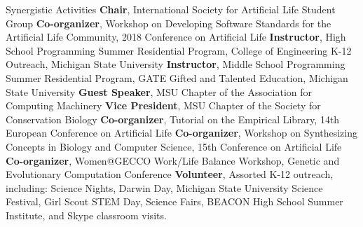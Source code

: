 \begin{rubric}{Synergistic Activities}
%
\entry*[2016 -- Present] \textbf{Chair}, International Society for Artificial Life Student Group 
%
\entry*[2018] \textbf{Co-organizer}, Workshop on Developing Software Standards for the Artificial Life Community, 2018 Conference on Artificial Life
%
\entry*[2017, 2018] \textbf{Instructor}, High School Programming Summer Residential Program, College of Engineering K-12 Outreach, Michigan State University
%
\entry*[2018] \textbf{Instructor}, Middle School Programming Summer Residential Program, GATE Gifted and Talented Education, Michigan State University
%
\entry*[2016 -- 2018] \textbf{Guest Speaker}, MSU Chapter of the Association for Computing Machinery
%
\entry*[2015 -- 2017] \textbf{Vice President}, MSU Chapter of the Society for Conservation Biology 
%
\entry*[2017] \textbf{Co-organizer}, Tutorial on the Empirical Library, 14th European Conference on Artificial Life
%
\entry*[2016] \textbf{Co-organizer}, Workshop on Synthesizing Concepts in Biology and Computer Science, 15th Conference on Artificial Life 
%
\entry*[2015] \textbf{Co-organizer}, Women@GECCO Work/Life Balance Workshop, Genetic and Evolutionary Computation Conference 
%
\entry*[2014 -- Present] \textbf{Volunteer}, Assorted K-12 outreach, including: Science Nights, Darwin Day, Michigan State University Science Festival, Girl Scout STEM Day, Science Fairs, BEACON High School Summer Institute, and Skype classroom visits.  
%
\vspace{-0.25cm} 


\ifshort
\else

\\


\fi

\end{rubric}
